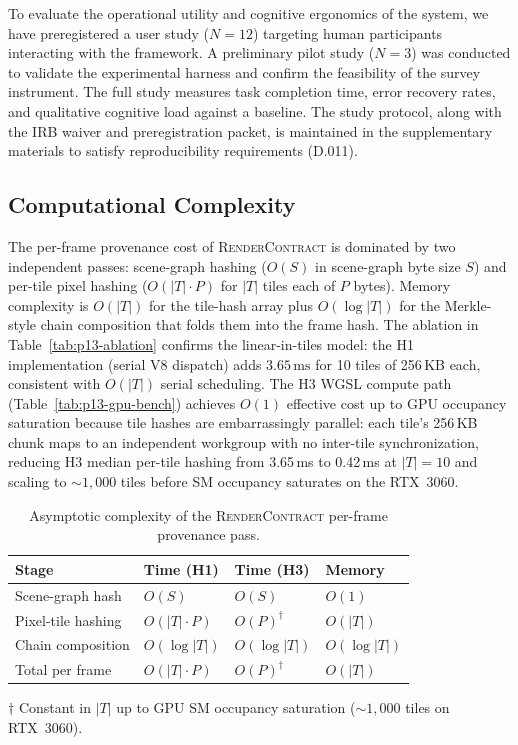 \documentclass[sigconf,nonacm]{acmart}
\newcommand{\rendercontract}{\textsc{RenderContract}}
\begin{document}
To evaluate the operational utility and cognitive ergonomics of the system, we have preregistered a user study ($N=12$) targeting human participants interacting with the framework. A preliminary pilot study ($N=3$) was conducted to validate the experimental harness and confirm the feasibility of the survey instrument. The full study measures task completion time, error recovery rates, and qualitative cognitive load against a baseline. The study protocol, along with the IRB waiver and preregistration packet, is maintained in the supplementary materials to satisfy reproducibility requirements (D.011).

\subsection{Computational Complexity}
\label{sec:complexity}

The per-frame provenance cost of \rendercontract{} is dominated by two
independent passes: scene-graph hashing ($O(S)$ in scene-graph byte size $S$)
and per-tile pixel hashing ($O(|T| \cdot P)$ for $|T|$ tiles each of $P$ bytes).
Memory complexity is $O(|T|)$ for the tile-hash array plus $O(\log |T|)$ for the
Merkle-style chain composition that folds them into the frame hash. The ablation
in Table~\ref{tab:p13-ablation} confirms the linear-in-tiles model: the H1
implementation (serial V8 dispatch) adds $3.65\,\text{ms}$ for 10 tiles of
256\,KB each, consistent with $O(|T|)$ serial scheduling. The H3 WGSL
compute path (Table~\ref{tab:p13-gpu-bench}) achieves $O(1)$ effective cost up
to GPU occupancy saturation because tile hashes are embarrassingly parallel:
each tile's 256\,KB chunk maps to an independent workgroup with no
inter-tile synchronization, reducing H3 median per-tile hashing from
3.65\,ms to 0.42\,ms at $|T|=10$ and scaling to ${\sim}1{,}000$ tiles
before SM occupancy saturates on the RTX~3060.

\begin{table}[t]
  \centering
  \caption{Asymptotic complexity of the \rendercontract{} per-frame provenance pass.}
  \label{tab:complexity}
  \footnotesize
  \begin{tabular}{@{}llll@{}}
    \toprule
    \textbf{Stage} & \textbf{Time (H1)} & \textbf{Time (H3)} & \textbf{Memory} \\
    \midrule
    Scene-graph hash & $O(S)$ & $O(S)$ & $O(1)$ \\
    Pixel-tile hashing & $O(|T| \cdot P)$ & $O(P)^{\dagger}$ & $O(|T|)$ \\
    Chain composition & $O(\log |T|)$ & $O(\log |T|)$ & $O(\log |T|)$ \\
    \midrule
    Total per frame & $O(|T| \cdot P)$ & $O(P)^{\dagger}$ & $O(|T|)$ \\
    \bottomrule
  \end{tabular}
  \vspace{2pt}
  {\footnotesize $\dagger$ Constant in $|T|$ up to GPU SM occupancy saturation
  (${\sim}1{,}000$ tiles on RTX~3060).}
\end{table}
\end{document}
